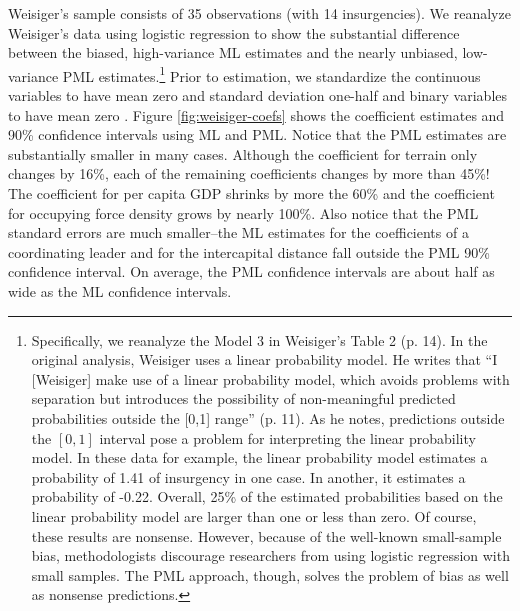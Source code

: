 \documentclass[12pt]{article}
\begin{document}
Weisiger's sample consists of 35 observations (with 14 insurgencies). 
We reanalyze Weisiger's data using logistic regression to show the substantial difference between the biased, high-variance ML estimates and the nearly unbiased, low-variance PML estimates.\footnote{Specifically, we reanalyze the Model 3 in Weisiger's Table 2 (p. 14). 
In the original analysis, Weisiger uses a linear probability model. 
He writes that ``I [Weisiger] make use of a linear probability model, which avoids problems with separation but introduces the possibility of non-meaningful predicted probabilities outside the [0,1] range'' (p. 11).
As he notes, predictions outside the $[0, 1]$ interval pose a problem for interpreting the linear probability model. 
In these data for example, the linear probability model estimates a probability of 1.41 of insurgency in one case. 
In another, it estimates a probability of -0.22. 
Overall, 25\% of the estimated probabilities based on the linear probability model are larger than one or less than zero.
Of course, these results are nonsense. 
However, because of the well-known small-sample bias, methodologists discourage researchers from using logistic regression with small samples.
The PML approach, though, solves the problem of bias as well as nonsense predictions.} Prior to estimation, we standardize the continuous variables to have mean zero and standard deviation one-half and binary variables to have mean zero \citep{Gelman2008}.
Figure \ref{fig:weisiger-coefs} shows the coefficient estimates and 90\% confidence intervals using ML and PML. 
Notice that the PML estimates are substantially smaller in many cases.
Although the coefficient for terrain only changes by 16\%, each of the remaining coefficients changes by more than 45\%! 
The coefficient for per capita GDP shrinks by more the 60\% and the coefficient for occupying force density grows by nearly 100\%.
Also notice that the PML standard errors are much smaller--the ML estimates for the coefficients of a coordinating leader and for the intercapital distance fall outside the PML 90\% confidence interval.
On average, the PML confidence intervals are about half as wide as the ML confidence intervals.
\end{document}
